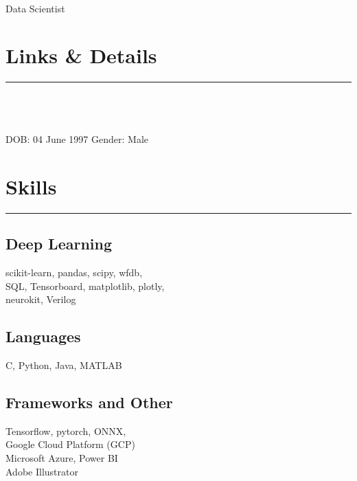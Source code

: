 \documentclass[]{rahulworld-resume}
\begin{document}
%
%

\begin{minipage}[t]{0.33\textwidth} 
\begin{large}
	\\
\end{large}
Data Scientist\\

\section{Links \& Details} 
\noindent\rule{5cm}{0.4pt}

\href{https://github.com/anoushkrit}{} \\
\href{https://www.linkedin.com/in/anoushkrit}{} \\
\href{www.anoushkritgoel.com}{} \\

DOB: 04 June 1997
Gender: Male
\section{Skills}
\noindent\rule{5cm}{0.4pt}
\subsection{Deep Learning}
scikit-learn, pandas, scipy, wfdb,\\
SQL, Tensorboard, matplotlib, plotly, \\
neurokit, Verilog
\vspace{6pt}
\subsection{Languages}
C, Python, Java, MATLAB
\vspace{6pt}
\subsection{Frameworks and Other}
Tensorflow, pytorch, ONNX,\\
Google Cloud Platform (GCP)\\
Microsoft Azure, Power BI \\
Adobe Illustrator\\


\end{minipage}
\end{document}
